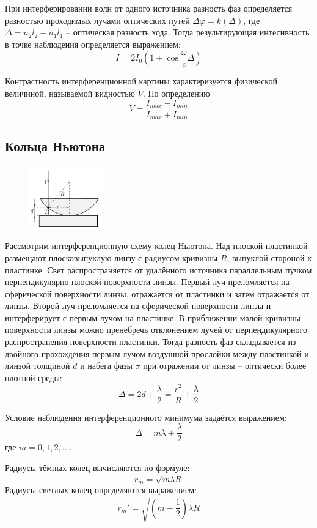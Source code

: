 При интерферировании волн от одного источника разность фаз определяется 
разностью проходимых лучами оптических путей $\Delta \varphi = k (\Delta)$, где 
$\Delta = n_2 l_2 - n_1 l_1$ -- оптическая разность хода. Тогда результирующая 
интесивность в точке наблюдения определяется выражением:
$$
I = 2I_0 \left( 1 + \cos \frac{\omega}{c} \Delta \right)
$$

Контрастность интерференционной картины характеризуется физической величиной, 
называемой видностью $V$. По определению
$$
V = \frac{I_{max} - I_{min}}{I_{max} + I_{min}}
$$

\subsection*{Кольца Ньютона}

\begin{figure}
	\centering
	\includegraphics[width=0.28\textwidth]{../Изображения/Кольца Ньютона.png}
\end{figure}

Рассмотрим интерференционную схему колец Ньютона. Над плоской пластинкой 
размещают плосковыпуклую линзу с радиусом кривизны $R$, выпуклой стороной к 
пластинке. Свет 
распространяется от удалённого источника параллельным пучком перпендикулярно 
плоской поверхности линзы. Первый луч преломляется на сферической поверхности 
линзы, отражается от пластинки и затем отражается от линзы. Второй луч 
преломляется на сферической поверхности линзы  и интерферирует с первым лучом 
на пластинке. В приближении малой кривизны поверхности линзы можно пренебречь 
отклонением лучей от перпендикулярного распространения поверхности пластинки. 
Тогда разность фаз складывается из двойного прохождения первым 
лучом воздушной прослойки между пластинкой и линзой толщиной $d$ и набега фазы 
$\pi$ при отражении от линзы -- оптически более плотной среды:
$$
\Delta = 2 d + \frac{\lambda}{2} = \frac{r^2}{R} + \frac{\lambda}{2}
$$

Условие наблюдения интерференционного минимума задаётся выражением:
$$
\Delta = m \lambda + \frac{\lambda}{2}
$$
где $m = 0, 1, 2, \dots$.

Радиусы тёмных колец вычисляются по формуле:
$$
r_m = \sqrt{m \lambda R}
$$
Радиусы светлых колец определяются выражением:
$$
r_m' = \sqrt{(m - \frac{1}{2}) \lambda R}
$$
